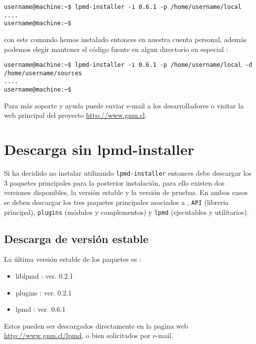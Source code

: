 \begin{verbatim}
username@machine:~$ lpmd-installer -i 0.6.1 -p /home/username/local
....
username@machine:~$
\end{verbatim}

con este comando hemos instalado entonces {\lpmd} en nuestra cuenta personal, adem\'as podemos elegir mantener el c\'odigo fuente en algun directorio en especial :

\begin{verbatim}
username@machine:~$ lpmd-installer -i 0.6.1 -p /home/username/local -d /home/username/sources
....
username@machine:~$
\end{verbatim}

Para m\'as soporte y ayuda puede enviar e-mail a los desarrolladores o visitar la web principal del proyecto \url{http://www.gnm.cl}.

\section{Descarga sin lpmd-installer}
\label{sec:descarga}

Si ha decidido no instalar {\lpmd} utilizando \verb|lpmd-installer| entonces debe descargar los 3 paquetes principales para la posterior instalaci\'on, para ello existen dos versiones disponibles, la versi\'on estable y la versi\'on de pruebas. En ambos casos se deben descargar los tres paquetes principales asociados a {\lpmd}, \verb|API| (libreria principal), \verb|plugins| (m\'odulos y complementos) y \verb|lpmd| (ejecutables y utilitarios).

\subsection{Descarga de versi\'on estable}

La \'ultima versi\'on estable de los paquetes es :

\begin{itemize}
 \item liblpmd : ver. 0.2.1
 \item plugins : ver. 0.2.1
 \item lpmd    : ver. 0.6.1
\end{itemize}

Estos pueden ser descargados directamente en la pagina web \url{http://www.gnm.cl/lpmd}, o bien solicitados por e-mail.

